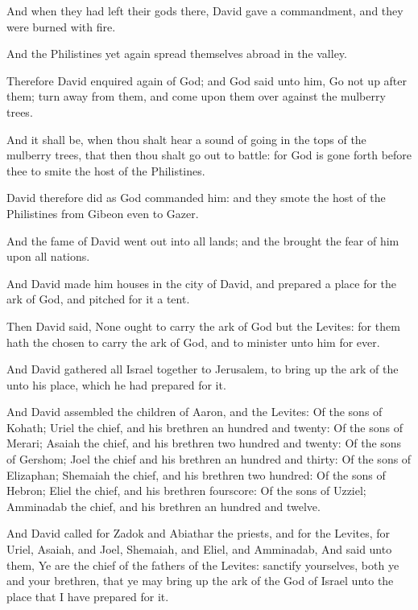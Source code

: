 \Verse And when they had left their gods there, David gave a commandment, and they were burned with fire.

\Verse And the Philistines yet again spread themselves abroad in the valley.

\Verse Therefore David enquired again of God; and God said unto him, Go not up after them; turn away from them, and come upon them over against the mulberry trees.

\Verse And it shall be, when thou shalt hear a sound of going in the tops of the mulberry trees, that then thou shalt go out to battle: for God is gone forth before thee to smite the host of the Philistines.

\Verse David therefore did as God commanded him: and they smote the host of the Philistines from Gibeon even to Gazer.

\Verse And the fame of David went out into all lands; and the \LORD brought the fear of him upon all nations.


\Chapter
\Verse And David made him houses in the city of David, and prepared a place for the ark of God, and pitched for it a tent.

\Verse Then David said, None ought to carry the ark of God but the Levites: for them hath the \LORD chosen to carry the ark of God, and to minister unto him for ever.

\Verse And David gathered all Israel together to Jerusalem, to bring up the ark of the \LORD unto his place, which he had prepared for it.

\Verse And David assembled the children of Aaron, and the Levites: \Verse Of the sons of Kohath; Uriel the chief, and his brethren an hundred and twenty: \Verse Of the sons of Merari; Asaiah the chief, and his brethren two hundred and twenty: \Verse Of the sons of Gershom; Joel the chief and his brethren an hundred and thirty: \Verse Of the sons of Elizaphan; Shemaiah the chief, and his brethren two hundred: \Verse Of the sons of Hebron; Eliel the chief, and his brethren fourscore: \Verse Of the sons of Uzziel; Amminadab the chief, and his brethren an hundred and twelve.

\Verse And David called for Zadok and Abiathar the priests, and for the Levites, for Uriel, Asaiah, and Joel, Shemaiah, and Eliel, and Amminadab, \Verse And said unto them, Ye are the chief of the fathers of the Levites: sanctify yourselves, both ye and your brethren, that ye may bring up the ark of the \LORD God of Israel unto the place that I have prepared for it.

